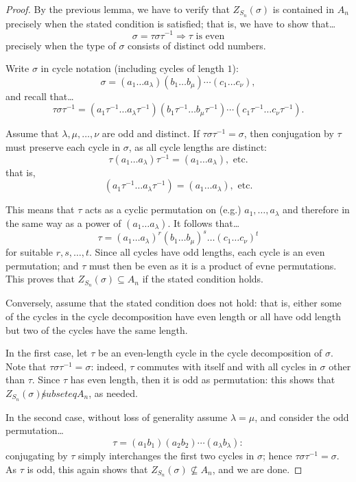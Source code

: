 \begin{proof}
By the previous lemma, we have to verify that $Z_{S_n}(\sigma)$ is contained in $A_n$ precisely when the stated condition is satisfied; that is, we have to show that\dots
$$\sigma = \tau \sigma \tau^{-1} \Rightarrow \tau \textrm{ is even}$$
precisely when the type of $\sigma$ consists of distinct odd numbers.

Write $\sigma$ in cycle notation (including cycles of length $1$):
$$\sigma = (a_1 \dots a_{\lambda})(b_1 \dots b_{\mu})\cdots(c_1\dots c_{\nu}),$$
and recall that\dots
$$\tau \sigma \tau^{-1} = (a_1\tau^{-1}\dots a_{\lambda}\tau^{-1})(b_1\tau^{-1}\dots b_{\mu}\tau^{-1})\cdots(c_1\tau^{-1}\dots c_{\nu}\tau^{-1}).$$

Assume that $\lambda, \mu, \dots , \nu$ are odd and distinct. If $\tau \sigma \tau^{-1} = \sigma$, then conjugation by $\tau$ must preserve each cycle in $\sigma$, as all cycle lengths are distinct:
$$\tau (a_1 \dots a_{\lambda})\tau^{-1} = (a_1 \dots a_{\lambda}), \textrm{ etc.}$$
that is,
$$(a_1 \tau^{-1} \dots a_{\lambda} \tau^{-1}) = (a_1 \dots a_{\lambda}), \textrm{ etc.}$$

This means that $\tau$ acts as a cyclic permutation on (e.g.) $a_1, \dots, a_{\lambda}$ and therefore in
the same way as a power of $(a_1 \dots a_{\lambda})$. It follows that\dots
$$\tau = (a_1 \dots a_{\lambda})^r(b_1 \dots b_{\mu})^s \dots (c_1 \dots c_{\nu})^t$$
for suitable $r,s, \dots, t$. Since all cycles have odd lengths, each cycle is an even permutation; and $\tau$ must then be even as it is a product of evne permutations. This proves that $Z_{S_n}(\sigma) \subseteq A_n$
if the stated condition holds.

Conversely, assume that the stated condition does not hold: that is, either some of the cycles in the cycle decomposition have even length or all have odd length but two of the cycles have the same length.

In the first case, let $\tau$ be an even-length cycle in the cycle decomposition of $\sigma$. Note that $\tau \sigma \tau^{-1} = \sigma$: indeed, $\tau$ commutes with itself and with all cycles in $\sigma$ other than $\tau$.
Since $\tau$ has even length, then it is odd as permutation: this shows that $Z_{S_n}(\sigma) \not subseteq A_n$, as needed.

In the second case, without loss of generality assume $\lambda = \mu$, and consider the odd permutation\dots
$$\tau = (a_1b_1)(a_2b_2)\cdots(a_{\lambda}b_{\lambda}):$$
conjugating by $\tau$ simply interchanges the first two cycles in $\sigma$; hence $\tau \sigma \tau^{-1} = \sigma$. As $\tau$ is odd, this again shows that $Z_{S_n}(\sigma) \not \subseteq A_n$, and we are done.
\end{proof}

